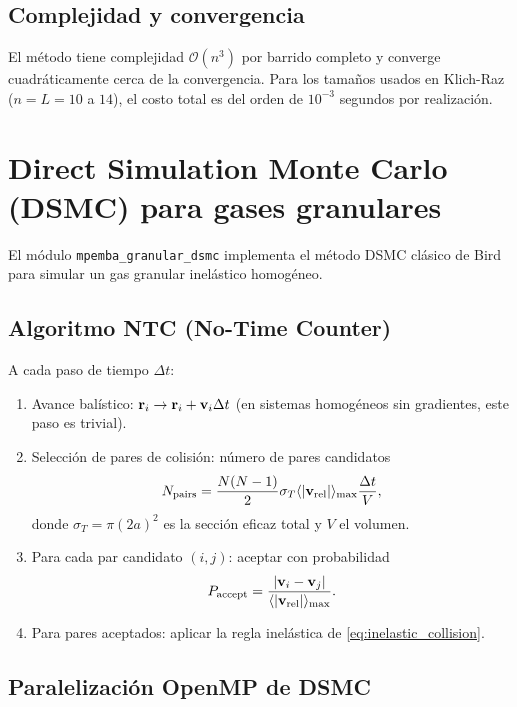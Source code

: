 \subsection{Complejidad y convergencia}

El método tiene complejidad $\mathcal{O}(n^3)$ por barrido completo y converge 
cuadráticamente cerca de la convergencia. Para los tamaños usados en 
Klich-Raz ($n = L = 10$ a $14$), el costo total es del orden de $10^{-3}$ 
segundos por realización.

\section{Direct Simulation Monte Carlo (DSMC) para gases granulares}

El módulo \texttt{mpemba\_granular\_dsmc} implementa el método DSMC clásico de 
Bird~\cite{bird1994} para simular un gas granular inelástico homogéneo.

\subsection{Algoritmo NTC (No-Time Counter)}

A cada paso de tiempo $\Delta t$:
\begin{enumerate}
\item Avance balístico: $\vb{r}_i \to \vb{r}_i + \vb{v}_i \Delta t$ (en sistemas 
homogéneos sin gradientes, este paso es trivial).
\item Selección de pares de colisión: número de pares candidatos
\begin{equation}
    N_{\mathrm{pairs}} = \frac{N (N-1)}{2} \sigma_T \langle \abs{\vb{v}_{\mathrm{rel}}} \rangle_{\max} \frac{\Delta t}{V},
\end{equation}
donde $\sigma_T = \pi (2a)^2$ es la sección eficaz total y $V$ el volumen.
\item Para cada par candidato $(i, j)$: aceptar con probabilidad
\begin{equation}
    P_{\mathrm{accept}} = \frac{\abs{\vb{v}_i - \vb{v}_j}}{\langle \abs{\vb{v}_{\mathrm{rel}}} \rangle_{\max}}.
\end{equation}
\item Para pares aceptados: aplicar la regla inelástica de \cref{eq:inelastic_collision}.
\end{enumerate}

\subsection{Paralelización OpenMP de DSMC}

